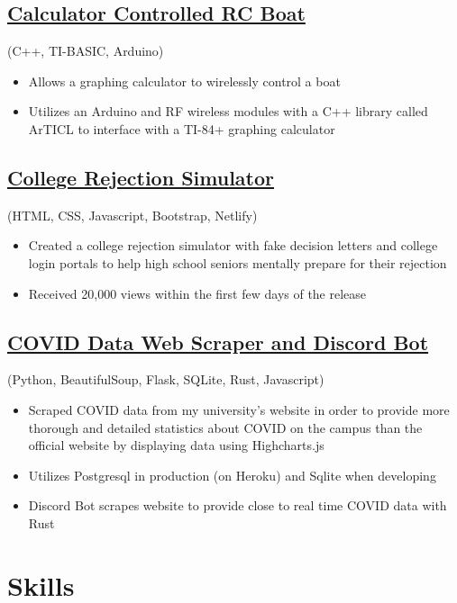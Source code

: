 \documentclass{article}
\begin{document}
\subsection{\href{https://github.com/jshin313/CalcControlledBoat}{Calculator Controlled RC Boat}} (C++, TI-BASIC, Arduino)
\begin{itemize}
    \item Allows a graphing calculator to wirelessly control a boat
    \item Utilizes an Arduino and RF wireless modules with a C++ library called ArTICL to interface with a TI-84+ graphing calculator
\end{itemize}

\subsection{\href{https://ivyhub.org/decision-letters/}{College Rejection Simulator}} (HTML, CSS, Javascript, Bootstrap, Netlify)
\begin{itemize}
    \item Created a college rejection simulator with fake decision letters and college login portals to help high school seniors mentally prepare for their rejection
    \item Received 20,000 views within the first few days of the release
\end{itemize}

\subsection{\href{https://github.com/jshin313/unofficial-temple-covid-live-dashboard}{COVID Data Web Scraper and Discord Bot}} (Python, BeautifulSoup, Flask, SQLite, Rust, Javascript)
\begin{itemize}
    \item Scraped COVID data from my university's website in order to provide more thorough and detailed statistics about COVID on the campus than the official website by displaying data using Highcharts.js
    \item Utilizes Postgresql in production (on Heroku) and Sqlite when developing
    \item Discord Bot scrapes website to provide close to real time COVID data with Rust
\end{itemize}

\section{Skills}
\end{document}
